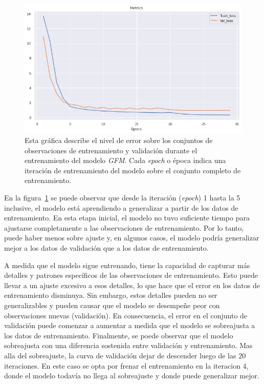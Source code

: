 \documentclass[11pt,a4paper,twoside]{thesis}
\begin{document}
\begin{figure}[ht]
	\centering
	\includegraphics[width=13cm]{./images/metrics-GFM-train-val-loss.png}
	\caption{
		Esta gráfica describe el nivel de error sobre los conjuntos
		de observaciones de entrenamiento y validación durante el
		entrenamiento del modelo \textit{GFM}. Cada \textit{epoch} o época
		indica una iteración de entrenamiento del modelo sobre el conjunto
		completo de entrenamiento.
	}
	\label{fig:gmfLoss}
\end{figure}

En la figura~\ref{fig:gmfLoss} se puede observar que desde la iteración
(\textit{epoch}) 1 hasta la 5 inclusive, el modelo está aprendiendo a
generalizar a partir de los datos de entrenamiento. En esta etapa inicial, el
modelo no tuvo suficiente tiempo para ajustarse completamente a las
observaciones de entrenamiento. Por lo tanto, puede haber menos sobre ajuste y,
en algunos casos, el modelo podría generalizar mejor a los datos de validación
que a los datos de entrenamiento.

A medida que el modelo sigue entrenando, tiene la capacidad de capturar más
detalles y patrones específicos de las observaciones de entrenamiento. Esto
puede llevar a un ajuste excesivo a esos detalles, lo que hace que el error en
los datos de entrenamiento disminuya. Sin embargo, estos detalles pueden no ser
generalizables y pueden causar que el modelo se desempeñe peor con
observaciones nuevas (validación). En consecuencia, el error en el conjunto de
validación puede comenzar a aumentar a medida que el modelo se sobreajusta a
los datos de entrenamiento. Finalmente, se poede observar que el modelo
sobreajusta con una diferencia sostenida entre validación y entrenamiento. Mas
alla del sobreajuste, la curva de validación dejar de descender luego de las
$20$ iteraciones. En este caso se opta por frenar el entrenamiento en la
iteracion 4, donde el modelo todavía no llega al sobreajuste y donde puede
generalizar mejor.
\end{document}
